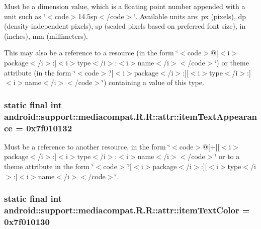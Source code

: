 Must be a dimension value, which is a floating point number appended with a unit such as \char`\"{}$<$code$>$14.5sp$<$/code$>$\char`\"{}. Available units are: px (pixels), dp (density-independent pixels), sp (scaled pixels based on preferred font size), in (inches), mm (millimeters). 

This may also be a reference to a resource (in the form \char`\"{}$<$code$>$@\mbox{[}$<$i$>$package$<$/i$>$:\mbox{]}$<$i$>$type$<$/i$>$:$<$i$>$name$<$/i$>$$<$/code$>$\char`\"{}) or theme attribute (in the form \char`\"{}$<$code$>$?\mbox{[}$<$i$>$package$<$/i$>$:\mbox{]}\mbox{[}$<$i$>$type$<$/i$>$:\mbox{]}$<$i$>$name$<$/i$>$$<$/code$>$\char`\"{}) containing a value of this type. \hypertarget{classandroid_1_1support_1_1mediacompat_1_1_r_1_1attr_4327620de603afab7ad3cb144be40d11}{
\subsubsection[{itemTextAppearance}]{\setlength{\rightskip}{0pt plus 5cm}static final int android::support::mediacompat.R.R::attr::itemTextAppearance = 0x7f010132}}
\label{classandroid_1_1support_1_1mediacompat_1_1_r_1_1attr_4327620de603afab7ad3cb144be40d11}


Must be a reference to another resource, in the form \char`\"{}$<$code$>$@\mbox{[}+\mbox{]}\mbox{[}$<$i$>$package$<$/i$>$:\mbox{]}$<$i$>$type$<$/i$>$:$<$i$>$name$<$/i$>$$<$/code$>$\char`\"{} or to a theme attribute in the form \char`\"{}$<$code$>$?\mbox{[}$<$i$>$package$<$/i$>$:\mbox{]}\mbox{[}$<$i$>$type$<$/i$>$:\mbox{]}$<$i$>$name$<$/i$>$$<$/code$>$\char`\"{}. \hypertarget{classandroid_1_1support_1_1mediacompat_1_1_r_1_1attr_b5f33a317ef130d961eba14ac531b970}{
\subsubsection[{itemTextColor}]{\setlength{\rightskip}{0pt plus 5cm}static final int android::support::mediacompat.R.R::attr::itemTextColor = 0x7f010130}}
\label{classandroid_1_1support_1_1mediacompat_1_1_r_1_1attr_b5f33a317ef130d961eba14ac531b970}


